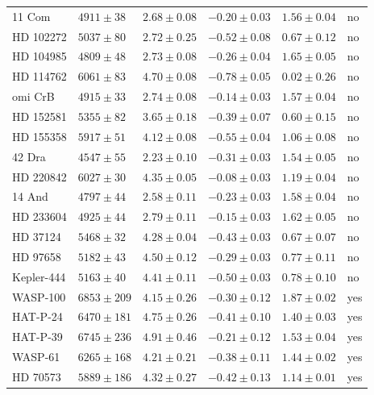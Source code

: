 \documentclass{aa}
\begin{document}
\begin{table}[htb!]
\begin{tabular}{llllll}
       11 Com     &  $4911 \pm  38$      &  $2.68 \pm 0.08$    &  $-0.20 \pm 0.03$    &  $1.56 \pm 0.04$             &  no \\
    HD 102272     &  $5037 \pm  80$      &  $2.72 \pm 0.25$    &  $-0.52 \pm 0.08$    &  $0.67 \pm 0.12$             &  no \\
    HD 104985     &  $4809 \pm  48$      &  $2.73 \pm 0.08$    &  $-0.26 \pm 0.04$    &  $1.65 \pm 0.05$             &  no \\
    HD 114762     &  $6061 \pm  83$      &  $4.70 \pm 0.08$    &  $-0.78 \pm 0.05$    &  $0.02 \pm 0.26$             &  no \\
      omi CrB     &  $4915 \pm  33$      &  $2.74 \pm 0.08$    &  $-0.14 \pm 0.03$    &  $1.57 \pm 0.04$             &  no \\
    HD 152581     &  $5355 \pm  82$      &  $3.65 \pm 0.18$    &  $-0.39 \pm 0.07$    &  $0.60 \pm 0.15$             &  no \\
    HD 155358     &  $5917 \pm  51$      &  $4.12 \pm 0.08$    &  $-0.55 \pm 0.04$    &  $1.06 \pm 0.08$             &  no \\
       42 Dra     &  $4547 \pm  55$      &  $2.23 \pm 0.10$    &  $-0.31 \pm 0.03$    &  $1.54 \pm 0.05$             &  no \\
    HD 220842     &  $6027 \pm  30$      &  $4.35 \pm 0.05$    &  $-0.08 \pm 0.03$    &  $1.19 \pm 0.04$             &  no \\
       14 And     &  $4797 \pm  44$      &  $2.58 \pm 0.11$    &  $-0.23 \pm 0.03$    &  $1.58 \pm 0.04$             &  no \\
    HD 233604     &  $4925 \pm  44$      &  $2.79 \pm 0.11$    &  $-0.15 \pm 0.03$    &  $1.62 \pm 0.05$             &  no \\
     HD 37124     &  $5468 \pm  32$      &  $4.28 \pm 0.04$    &  $-0.43 \pm 0.03$    &  $0.67 \pm 0.07$             &  no \\
     HD 97658     &  $5182 \pm  43$      &  $4.50 \pm 0.12$    &  $-0.29 \pm 0.03$    &  $0.77 \pm 0.11$             &  no \\
   Kepler-444     &  $5163 \pm  40$      &  $4.41 \pm 0.11$    &  $-0.50 \pm 0.03$    &  $0.78 \pm 0.10$             &  no \\
     WASP-100     &  $6853 \pm 209$      &  $4.15 \pm 0.26$    &  $-0.30 \pm 0.12$    &  $1.87 \pm 0.02$             &  yes\\
     HAT-P-24     &  $6470 \pm 181$      &  $4.75 \pm 0.26$    &  $-0.41 \pm 0.10$    &  $1.40 \pm 0.03$             &  yes\\
     HAT-P-39     &  $6745 \pm 236$      &  $4.91 \pm 0.46$    &  $-0.21 \pm 0.12$    &  $1.53 \pm 0.04$             &  yes\\
      WASP-61     &  $6265 \pm 168$      &  $4.21 \pm 0.21$    &  $-0.38 \pm 0.11$    &  $1.44 \pm 0.02$             &  yes\\
     HD 70573     &  $5889 \pm 186$      &  $4.32 \pm 0.27$    &  $-0.42 \pm 0.13$    &  $1.14 \pm 0.01$             &  yes\\
      \hline
    \end{tabular}
\end{table}
\end{document}
